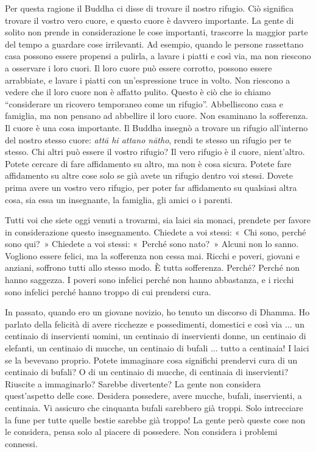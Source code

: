 Per questa ragione il Buddha ci disse di trovare il nostro rifugio. Ciò
significa trovare il vostro vero cuore, e questo cuore è davvero
importante. La gente di solito non prende in considerazione le cose
importanti, trascorre la maggior parte del tempo a guardare cose
irrilevanti. Ad esempio, quando le persone rassettano casa possono
essere propensi a pulirla, a lavare i piatti e così via, ma non riescono
a osservare i loro cuori. Il loro cuore può essere corrotto, possono
essere arrabbiate, e lavare i piatti con un'espressione truce in volto.
Non riescono a vedere che il loro cuore non è affatto pulito. Questo è
ciò che io chiamo ``considerare un ricovero temporaneo come un
rifugio''. Abbelliscono casa e famiglia, ma non pensano ad abbellire il
loro cuore. Non esaminano la sofferenza. Il cuore è una cosa importante.
Il Buddha insegnò a trovare un rifugio all'interno del nostro stesso
cuore: \emph{attā hi attano nātho}, rendi te stesso un rifugio per te
stesso. Chi altri può essere il vostro rifugio? Il vero rifugio è il
cuore, nient'altro. Potete cercare di fare affidamento su altro, ma non
è cosa sicura. Potete fare affidamento su altre cose solo se già avete
un rifugio dentro voi stessi. Dovete prima avere un vostro vero rifugio,
per poter far affidamento su qualsiasi altra cosa, sia essa un
insegnante, la famiglia, gli amici o i parenti.

Tutti voi che siete oggi venuti a trovarmi, sia laici sia monaci,
prendete per favore in considerazione questo insegnamento. Chiedete a
voi stessi: «~Chi sono, perché sono qui?~» Chiedete a voi stessi:
«~Perché sono nato?~» Alcuni non lo sanno. Vogliono essere felici, ma la
sofferenza non cessa mai. Ricchi e poveri, giovani e anziani, soffrono
tutti allo stesso modo. È tutta sofferenza. Perché? Perché non hanno
saggezza. I poveri sono infelici perché non hanno abbastanza, e i ricchi
sono infelici perché hanno troppo di cui prendersi cura.

In passato, quando ero un giovane novizio, ho tenuto un discorso di
Dhamma. Ho parlato della felicità di avere ricchezze e possedimenti,
domestici e così via ... un centinaio di inservienti uomini, un
centinaio di inservienti donne, un centinaio di elefanti, un centinaio
di mucche, un centinaio di bufali ... tutto a centinaia! I laici se la
bevevano proprio. Potete immaginare cosa significhi prendervi cura di un
centinaio di bufali? O di un centinaio di mucche, di centinaia di
inservienti? Riuscite a immaginarlo? Sarebbe divertente? La gente non
considera quest'aspetto delle cose. Desidera possedere, avere mucche,
bufali, inservienti, a centinaia. Vi assicuro che cinquanta bufali
sarebbero già troppi. Solo intrecciare la fune per tutte quelle bestie
sarebbe già troppo! La gente però queste cose non le considera, pensa
solo al piacere di possedere. Non considera i problemi connessi.

